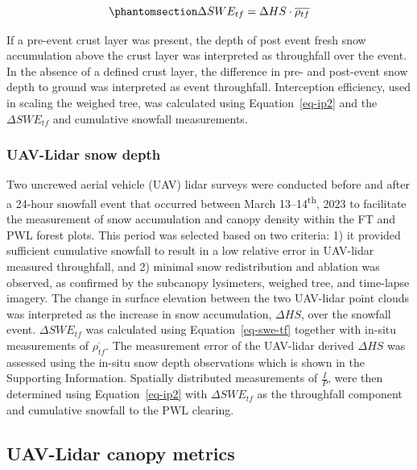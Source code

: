 \documentclass[
  letterpaper,
]{tex/uofsthesis-cs}
\begin{document}
\begin{equation}\phantomsection\label{eq-swe-tf}{
\Delta SWE_{tf} = \Delta HS \cdot \overline{\rho_{tf}}
}\end{equation}

If a pre-event crust layer was present, the depth of post event fresh
snow accumulation above the crust layer was interpreted as throughfall
over the event. In the absence of a defined crust layer, the difference
in pre- and post-event snow depth to ground was interpreted as event
throughfall. Interception efficiency, used in scaling the weighed tree,
was calculated using Equation~\ref{eq-ip2} and the \(\Delta SWE_{tf}\)
and cumulative snowfall measurements.

\subsubsection{UAV-Lidar snow depth}\label{uav-lidar-snow-depth}

Two uncrewed aerial vehicle (UAV) lidar surveys were conducted before
and after a 24-hour snowfall event that occurred between March
13--14\textsuperscript{th}, 2023 to facilitate the measurement of snow
accumulation and canopy density within the FT and PWL forest plots. This
period was selected based on two criteria: 1) it provided sufficient
cumulative snowfall to result in a low relative error in UAV-lidar
measured throughfall, and 2) minimal snow redistribution and ablation
was observed, as confirmed by the subcanopy lysimeters, weighed tree,
and time-lapse imagery. The change in surface elevation between the two
UAV-lidar point clouds was interpreted as the increase in snow
accumulation, \(\Delta HS\), over the snowfall event.
\(\Delta SWE_{tf}\) was calculated using Equation~\ref{eq-swe-tf}
together with in-situ measurements of \(\overline{\rho_{tf}}\). The
measurement error of the UAV-lidar derived \(\Delta HS\) was assessed
using the in-situ snow depth observations which is shown in the
Supporting Information. Spatially distributed measurements of
\(\frac{I}{P}\), were then determined using Equation~\ref{eq-ip2} with
\(\Delta SWE_{tf}\) as the throughfall component and cumulative snowfall
to the PWL clearing.

\subsection{UAV-Lidar canopy metrics}\label{uav-lidar-canopy-metrics}
\end{document}
